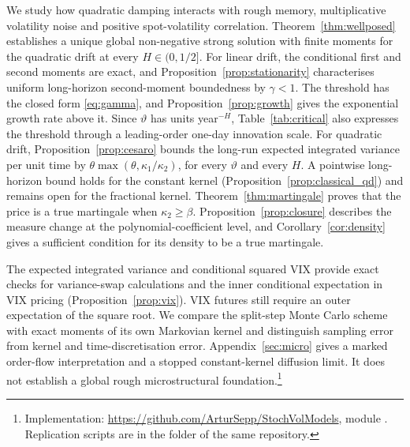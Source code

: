 We study how quadratic damping interacts with rough memory, multiplicative volatility noise and positive spot-volatility correlation. Theorem~\ref{thm:wellposed} establishes a unique global non-negative strong solution with finite moments for the quadratic drift at every $H\in(0,1/2]$. For linear drift, the conditional first and second moments are exact, and Proposition~\ref{prop:stationarity} characterises uniform long-horizon second-moment boundedness by $\gamma<1$. The threshold has the closed form \eqref{eq:gamma}, and Proposition~\ref{prop:growth} gives the exponential growth rate above it. Since $\vartheta$ has units year$^{-H}$, Table~\ref{tab:critical} also expresses the threshold through a leading-order one-day innovation scale. For quadratic drift, Proposition~\ref{prop:cesaro} bounds the long-run expected integrated variance per unit time by $\theta\max(\theta,\kappa_1/\kappa_2)$, for every $\vartheta$ and every $H$. A pointwise long-horizon bound holds for the constant kernel (Proposition~\ref{prop:classical_qd}) and remains open for the fractional kernel. Theorem~\ref{thm:martingale} proves that the price is a true martingale when $\kappa_2\ge\beta$. Proposition~\ref{prop:closure} describes the measure change at the polynomial-coefficient level, and Corollary~\ref{cor:density} gives a sufficient condition for its density to be a true martingale.

The expected integrated variance and conditional squared VIX provide exact checks for variance-swap calculations and the inner conditional expectation in VIX pricing (Proposition~\ref{prop:vix}). VIX futures still require an outer expectation of the square root. We compare the split-step Monte Carlo scheme with exact moments of its own Markovian kernel and distinguish sampling error from kernel and time-discretisation error. Appendix~\ref{sec:micro} gives a marked order-flow interpretation and a stopped constant-kernel diffusion limit. It does not establish a global rough microstructural foundation.\footnote{Implementation: \url{https://github.com/ArturSepp/StochVolModels}, module . Replication scripts are in the folder  of the same repository.}

